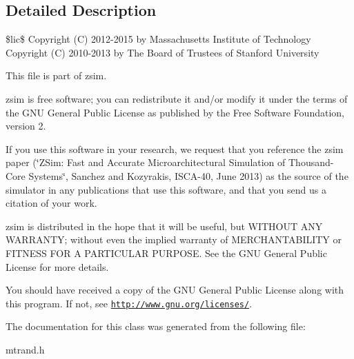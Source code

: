 \subsection{Detailed Description}
\$lic\$ Copyright (C) 2012-\/2015 by Massachusetts Institute of Technology Copyright (C) 2010-\/2013 by The Board of Trustees of Stanford University

This file is part of zsim.

zsim is free software; you can redistribute it and/or modify it under the terms of the G\-N\-U General Public License as published by the Free Software Foundation, version 2.

If you use this software in your research, we request that you reference the zsim paper (\char`\"{}\-Z\-Sim\-: Fast and Accurate Microarchitectural Simulation of
\-Thousand-\/\-Core Systems\char`\"{}, Sanchez and Kozyrakis, I\-S\-C\-A-\/40, June 2013) as the source of the simulator in any publications that use this software, and that you send us a citation of your work.

zsim is distributed in the hope that it will be useful, but W\-I\-T\-H\-O\-U\-T A\-N\-Y W\-A\-R\-R\-A\-N\-T\-Y; without even the implied warranty of M\-E\-R\-C\-H\-A\-N\-T\-A\-B\-I\-L\-I\-T\-Y or F\-I\-T\-N\-E\-S\-S F\-O\-R A P\-A\-R\-T\-I\-C\-U\-L\-A\-R P\-U\-R\-P\-O\-S\-E. See the G\-N\-U General Public License for more details.

You should have received a copy of the G\-N\-U General Public License along with this program. If not, see \href{http://www.gnu.org/licenses/}{\tt http\-://www.\-gnu.\-org/licenses/}. 

The documentation for this class was generated from the following file\-:\begin{DoxyCompactItemize}
\item 
mtrand.\-h\end{DoxyCompactItemize}
